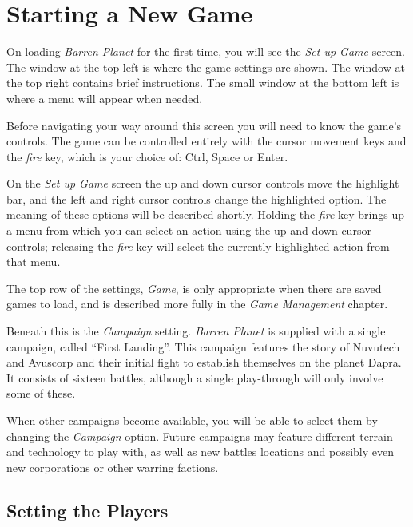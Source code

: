 %
%
%

\chapter{Starting a New Game}

\noindent
On loading {\it Barren Planet} for the first time, you will see the {\it Set up Game} screen. The window at the top left is where the game settings are shown. The window at the top right contains brief instructions. The small window at the bottom left is where a menu will appear when needed.

Before navigating your way around this screen you will need to know the game's controls. The game can be controlled entirely with the cursor movement keys and the {\it fire} key, which is your choice of: {\sc Ctrl}, {\sc Space} or {\sc Enter}.

On the {\it Set up Game} screen the up and down cursor controls move the highlight bar, and the left and right cursor controls change the highlighted option. The meaning of these options will be described shortly. Holding the {\it fire} key brings up a menu from which you can select an action using the up and down cursor controls; releasing the {\it fire} key will select the currently highlighted action from that menu.

The top row of the settings, {\it Game}, is only appropriate when there are saved games to load, and is described more fully in the {\it Game Management} chapter.

Beneath this is the {\it Campaign} setting. {\it Barren Planet} is supplied with a single campaign, called ``First Landing''. This campaign features the story of Nuvutech and Avuscorp and their initial fight to establish themselves on the planet Dapra. It consists of sixteen battles, although a single play-through will only involve some of these.

When other campaigns become available, you will be able to select them by changing the {\it Campaign} option. Future campaigns may feature different terrain and technology to play with, as well as new battles locations and possibly even new corporations or other warring factions. 

\section{Setting the Players}

